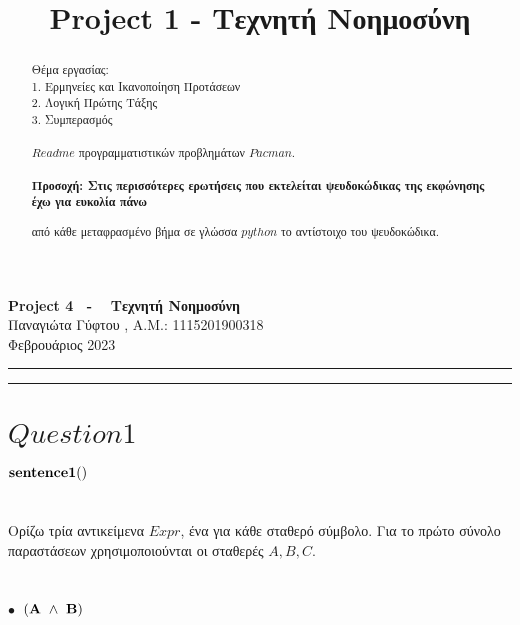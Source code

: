 \documentclass[10pt]{article}
\title{ \selectlanguage{english} Project 1 - \selectlanguage{greek} Τεχνητή Νοημοσύνη}
\begin{document}
   
   \begin{center}
        {\Large \textbf{ Project 4 \ - \  Τεχνητή Νοημοσύνη}}\\
        \vspace{1em}
        {\large Παναγιώτα Γύφτου ,   A.M.: 1115201900318  } \\
        \vspace{1em}
        {\large Φεβρουάριος 2023}
    \end{center}
    
    
    \begin{center}
        \rule{150mm}{0.2mm}
    \end{center}

    \begin{abstract}
    Θέμα εργασίας: \\ 
    
    \hspace{15mm}1. Ερμηνείες και Ικανοποίηση Προτάσεων \\ 

\hspace{15mm}2. Λογική Πρώτης Τάξης \\  

\hspace{15mm}3. Συμπερασμός \\ \\
    
    $Readme$ προγραμματιστικών προβλημάτων $Pacman$. \\ \\

    \bf Προσοχή: \normalfont Στις περισσότερες ερωτήσεις που εκτελείται ψευδοκώδικας της εκφώνησης έχω για ευκολία πάνω 
    
    \hspace{15mm}από κάθε μεταφρασμένο βήμα σε γλώσσα $python$ το αντίστοιχο του ψευδοκώδικα.

    \end{abstract}

    \begin{center}
        \rule{150mm}{0.2mm}
    \end{center}

    \vspace{5mm}

\section*{$Question 1$}
\vspace{5mm}
\underline{\underline{$\bf sentence1()$}} \\  \\ \\
Ορίζω τρία αντικείμενα $Expr$, ένα για κάθε σταθερό σύμβολο. Για το πρώτο σύνολο παραστάσεων χρησιμοποιούνται οι σταθερές $A,B,C$. \\ \\ \\
$\bullet \ $ $\bf (A \ \wedge \ B)$
\\
\end{document}
